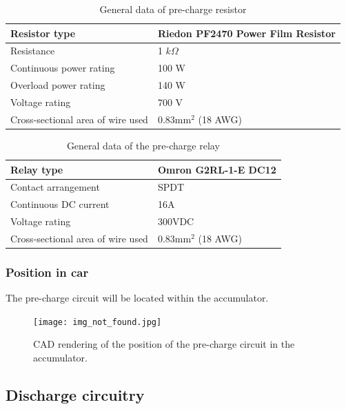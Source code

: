 \documentclass{article}
\begin{document}
    \begin{table}[H]
	    \centering
	    \begin{tabular}{|l|l|}
	    \hline
	    Resistor type & Riedon PF2470 Power Film Resistor \\ \hline
	    Resistance & 1 $k\Omega$ \\ \hline
	    Continuous power rating & 100 W \\ \hline
	    Overload power rating & 140 W \\ \hline
	    Voltage rating & 700 V \\ \hline
	    Cross-sectional area of wire used & 0.83mm$^2$ (18 AWG)\\ \hline
	    \end{tabular}
	    \caption{General data of pre-charge resistor}
	    \label{prechargeresistor}
	\end{table}

	\begin{table}[H]
	    \centering
	    \begin{tabular}{|l|l|}
	    \hline
	    Relay type & Omron G2RL-1-E DC12 \\ \hline
	    Contact arrangement & SPDT \\ \hline
	    Continuous DC current & 16A \\ \hline
	    Voltage rating & 300VDC \\ \hline
	    Cross-sectional area of wire used & 0.83mm$^2$ (18 AWG) \\ \hline
	    \end{tabular}
	    \caption{General data of the pre-charge relay}
	    \label{PCrelay}
	\end{table}

\subsubsection{Position in car}
The pre-charge circuit will be located within the accumulator. 

\begin{figure}[h]
    \centering
    \texttt{[image: img\_not\_found.jpg]}
    \caption{CAD rendering of the position of the pre-charge circuit in the accumulator.}
\end{figure}


\subsection{Discharge circuitry}\label{discharge_circuitry}
\end{document}
